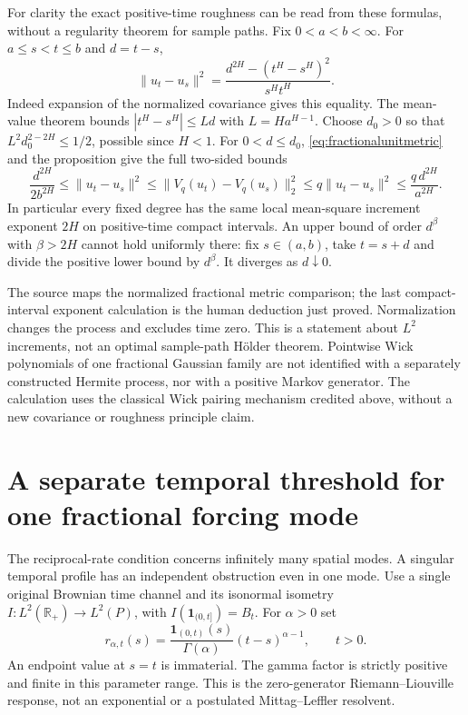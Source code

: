\documentclass[11pt]{article}
\newcommand{\R}{\mathbb R}\newcommand{\E}{\mathbb E}
\begin{document}
For clarity the exact positive-time roughness can be read from these
formulas, without a regularity theorem for sample paths. Fix
$0<a<b<\infty$. For $a\leq s<t\leq b$ and $d=t-s$,
\begin{equation}\label{eq:fractionalunitmetric}
 \|u_t-u_s\|^2
 =\frac{d^{2H}-(t^H-s^H)^2}{s^Ht^H}.
\end{equation}
Indeed expansion of the normalized covariance gives this equality.
The mean-value theorem bounds $|t^H-s^H|\leq Ld$ with
$L=Ha^{H-1}$. Choose $d_0>0$ so that
$L^2d_0^{2-2H}\leq1/2$, possible since $H<1$.
For $0<d\leq d_0$, \eqref{eq:fractionalunitmetric} and the proposition
give the full two-sided bounds
\[
 \frac{d^{2H}}{2b^{2H}}
 \leq\|u_t-u_s\|^2
 \leq\|V_q(u_t)-V_q(u_s)\|_2^2
 \leq q\|u_t-u_s\|^2
 \leq\frac{q\,d^{2H}}{a^{2H}}.
\]
In particular every fixed degree has the same local mean-square
increment exponent $2H$ on positive-time compact intervals. An upper
bound of order $d^\beta$ with $\beta>2H$ cannot hold uniformly there:
fix $s\in(a,b)$, take $t=s+d$ and divide the positive lower bound
by $d^\beta$. It diverges as $d\downarrow0$.

The source maps the normalized fractional metric comparison; the
last compact-interval exponent calculation is the human deduction
just proved. Normalization changes the process and excludes time
zero. This is a statement about $L^2$ increments, not an optimal
sample-path H\"older theorem. Pointwise Wick polynomials of one
fractional Gaussian family are not identified with a separately
constructed Hermite process, nor with a positive Markov generator.
The calculation uses the classical Wick pairing mechanism credited
above, without a new covariance or roughness principle claim.


\section{A separate temporal threshold for one fractional forcing mode}
The reciprocal-rate condition concerns infinitely many spatial modes.
A singular temporal profile has an independent obstruction even in one
mode. Use a single original Brownian time channel and its isonormal
isometry $I:L^2(\R_+)\to L^2(P)$, with
$I(\mathbf1_{(0,t]})=B_t$. For $\alpha>0$ set
\begin{equation}\label{eq:rlforcingprofile}
 r_{\alpha,t}(s)=\frac{\mathbf1_{(0,t)}(s)}{\Gamma(\alpha)}
                         (t-s)^{\alpha-1},\qquad t>0.
\end{equation}
An endpoint value at $s=t$ is immaterial. The gamma factor is strictly
positive and finite in this parameter range. This is the zero-generator
Riemann--Liouville response, not an exponential or a postulated
Mittag--Leffler resolvent.
\end{document}
